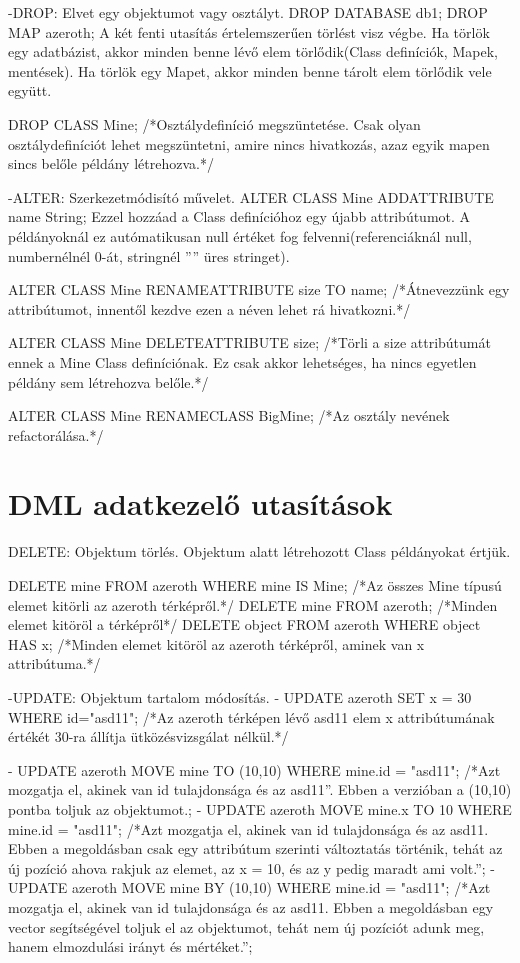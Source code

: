 -DROP: Elvet egy objektumot vagy osztályt.
DROP DATABASE db1;
DROP MAP azeroth;
A két fenti utasítás értelemszerűen törlést visz végbe. Ha törlök egy adatbázist, akkor minden benne lévő elem törlődik(Class definíciók, Mapek, mentések).
Ha törlök  egy Mapet, akkor minden benne tárolt elem törlődik vele együtt.

DROP CLASS Mine;   /*Osztálydefiníció megszüntetése. Csak olyan osztálydefiníciót lehet megszüntetni, amire nincs hivatkozás, azaz egyik mapen sincs belőle példány létrehozva.*/

-ALTER: Szerkezetmódisító művelet. 
ALTER CLASS Mine ADDATTRIBUTE name String;
Ezzel hozzáad a Class definícióhoz egy újabb attribútumot. A példányoknál ez autómatikusan null értéket fog felvenni(referenciáknál null, numbernélnél 0-át, stringnél ”” üres stringet).

ALTER CLASS Mine RENAMEATTRIBUTE size TO name;
/*Átnevezzünk egy attribútumot, innentől kezdve ezen a néven lehet rá hivatkozni.*/

ALTER CLASS Mine DELETEATTRIBUTE size;
/*Törli a size attribútumát ennek a Mine Class definíciónak. Ez csak akkor lehetséges, ha nincs egyetlen példány sem létrehozva belőle.*/

ALTER CLASS Mine RENAMECLASS BigMine;
/*Az osztály nevének refactorálása.*/

\section{DML adatkezelő utasítások}

DELETE: Objektum törlés. Objektum alatt létrehozott Class példányokat értjük.

DELETE mine FROM azeroth WHERE  mine IS Mine; /*Az összes Mine típusú elemet kitörli az azeroth térképről.*/
DELETE mine FROM azeroth;  /*Minden elemet kitöröl a térképről*/
DELETE object FROM azeroth WHERE object HAS x;  /*Minden elemet kitöröl az azeroth térképről, aminek van x attribútuma.*/

-UPDATE: Objektum tartalom módosítás.
- UPDATE azeroth SET x = 30 WHERE id="asd11";
/*Az azeroth térképen lévő asd11 elem x attribútumának értékét 30-ra állítja ütközésvizsgálat nélkül.*/

- UPDATE azeroth MOVE  mine TO  (10,10) WHERE mine.id = "asd11"; /*Azt mozgatja el, akinek van id tulajdonsága és az asd11”. Ebben a verzióban a (10,10) pontba toljuk az objektumot.;
- UPDATE azeroth MOVE  mine.x TO 10 WHERE mine.id = "asd11"; /*Azt mozgatja el, akinek van id tulajdonsága és az asd11. Ebben a megoldásban csak egy attribútum szerinti változtatás történik, tehát az új pozíció ahova rakjuk az elemet, az x = 10, és az y pedig maradt ami volt.”;
- UPDATE azeroth MOVE  mine BY  (10,10) WHERE mine.id = "asd11"; /*Azt mozgatja el, akinek van id tulajdonsága és az asd11. Ebben a megoldásban egy vector segítségével toljuk el az objektumot, tehát nem új pozíciót adunk meg, hanem elmozdulási irányt és mértéket.”;

